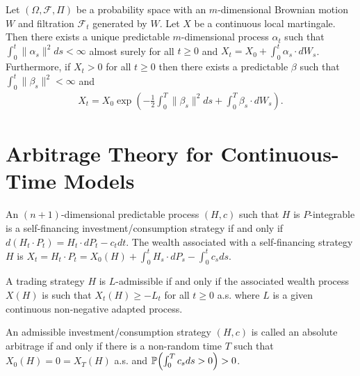 \begin{thm}
  \label{sec:brown-moti-stoch-13}
  Let $(\Omega, \mathcal{F}, \Pi)$ be a probability space with an
  $m$-dimensional Brownian motion $W$ and filtration $\mathcal{F}_{t}$
  generated by $W$.  Let $X$ be a continuous local martingale. Then
  there exists a unique predictable $m$-dimensional process
  $\alpha_{t}$ such that $\int_{0}^{t} \|\alpha_{s}\|^{2} ds < \infty$
  almost surely for all $t \geq 0$ and $X_{t} = X_{0} + \int_{0}^{t}
  \alpha_{s} \cdot dW_{s}$. Furthermore, if $X_{t} > 0$ for all $t
  \geq 0$ then there exists a predictable $\beta$ such that
  $\int_{0}^{t} \| \beta_{s}\|^{2} < \infty$ and
  \begin{align}
    \label{eq:23}
    X_{t} = X_{0} \exp(-\frac{1}{2} \int_{0}^{T} \| \beta_{s}\|^{2} ds
    + \int_{0}^{T} \beta_{s} \cdot dW_{s}).
  \end{align}
\end{thm}

\section{Arbitrage Theory for Continuous-Time Models}
\label{sec:arbitr-theory-cont}

\begin{defn}
  \label{sec:arbitr-theory-cont-2}
  An $(n+1)$-dimensional predictable process $(H, c)$ such that $H$ is
  $P$-integrable is a self-financing investment/consumption strategy
  if and only if $d(H_{t} \cdot P_{t}) = H_{t} \cdot dP_{t} - c_{t}
  dt$.  The wealth associated with a self-financing strategy $H$ is
  $X_{t} = H_{t} \cdot P_{t} = X_{0}(H) + \int_{0}^{t} H_{s} \cdot
  dP_{s} - \int_{0}^{t} c_{s} ds$.
\end{defn}

\begin{defn}
  \label{sec:arbitr-theory-cont-3}
  A trading strategy $H$ is $L$-admissible if and only if the
  associated wealth process $X(H)$ is such that $X_{t}(H) \geq -L_{t}$
  for all $t \geq 0$ a.s. where $L$ is a given continuous non-negative
  adapted process.
\end{defn}

\begin{defn}
  \label{sec:arbitr-theory-cont-4}
  An admissible investment/consumption strategy $(H, c)$ is called an
  absolute arbitrage if and only if there is a non-random time $T$
  such that $X_{0}(H) = 0 = X_{T}(H)$ a.s. and $\Prob{\int_{0}^{T}
    c_{s} ds > 0} > 0$.
\end{defn}

